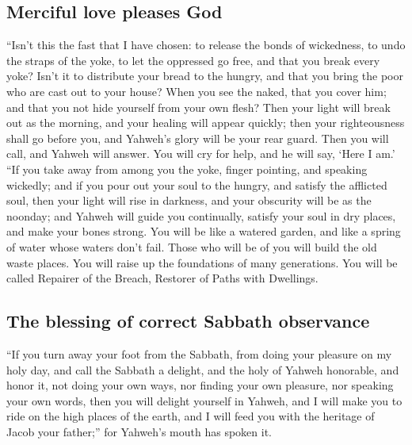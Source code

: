 \hypertarget{merciful-love-pleases-god}{%
\subsection{Merciful love pleases God}\label{merciful-love-pleases-god}}

 ``Isn't this the fast that I have chosen: to release the
bonds of wickedness, to undo the straps of the yoke, to let the
oppressed go free, and that you break every yoke?  Isn't
it to distribute your bread to the hungry, and that you bring the poor
who are cast out to your house? When you see the naked, that you cover
him; and that you not hide yourself from your own flesh? 
Then your light will break out as the morning, and your healing will
appear quickly; then your righteousness shall go before you, and
Yahweh's glory will be your rear guard.  Then you will
call, and Yahweh will answer. You will cry for help, and he will say,
`Here I am.' ``If you take away from among you the yoke, finger
pointing, and speaking wickedly;  and if you pour out
your soul to the hungry, and satisfy the afflicted soul, then your light
will rise in darkness, and your obscurity will be as the noonday;
 and Yahweh will guide you continually, satisfy your soul
in dry places, and make your bones strong. You will be like a watered
garden, and like a spring of water whose waters don't fail.
 Those who will be of you will build the old waste
places. You will raise up the foundations of many generations. You will
be called Repairer of the Breach, Restorer of Paths with Dwellings.

\hypertarget{the-blessing-of-correct-sabbath-observance}{%
\subsection{The blessing of correct Sabbath
observance}\label{the-blessing-of-correct-sabbath-observance}}

 ``If you turn away your foot from the Sabbath, from
doing your pleasure on my holy day, and call the Sabbath a delight, and
the holy of Yahweh honorable, and honor it, not doing your own ways, nor
finding your own pleasure, nor speaking your own words, 
then you will delight yourself in Yahweh, and I will make you to ride on
the high places of the earth, and I will feed you with the heritage of
Jacob your father;'' for Yahweh's mouth has spoken it.

